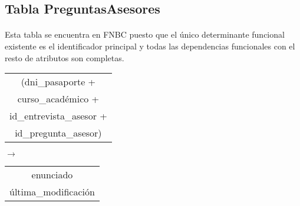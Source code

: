 \subsection{Tabla PreguntasAsesores}

  \paragraph{}Esta tabla se encuentra en FNBC puesto que el único determinante
  funcional existente es el identificador principal y todas las dependencias
  funcionales con el resto de atributos son completas.

  \begin{center}
    \begin{minipage}{4.5cm}{\begin{flushright}\begin{tabular}{ | c | }
                  \hline
                  (dni\_pasaporte + \\
                  curso\_académico + \\
                  id\_entrevista\_asesor + \\
                  id\_pregunta\_asesor) \\
                  \hline
                 \end{tabular}\end{flushright} }
    \end{minipage}
    \begin{minipage}{0.7cm}{$\longrightarrow$}
    \end{minipage}
    \begin{minipage}{5.9cm}{\begin{tabular}{ | c | }
                  \hline
                  enunciado \\
                  última\_modificación \\
                  \hline
                 \end{tabular} }
    \end{minipage}
  \end{center}
